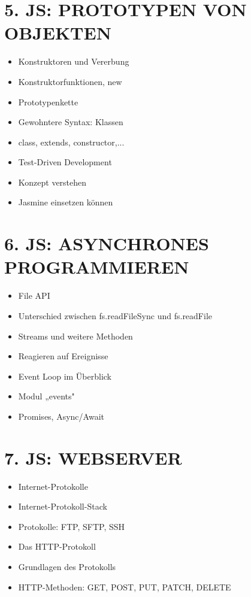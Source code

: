 \section*{5. JS: PROTOTYPEN VON OBJEKTEN}
\begin{itemize}
  \item Konstruktoren und Vererbung
  \item Konstruktorfunktionen, new
  \item Prototypenkette
  \item Gewohntere Syntax: Klassen
  \item class, extends, constructor,...
  \item Test-Driven Development
  \item Konzept verstehen
  \item Jasmine einsetzen können
\end{itemize}

\section*{6. JS: ASYNCHRONES PROGRAMMIEREN}
\begin{itemize}
  \item File API
  \item Unterschied zwischen fs.readFileSync und fs.readFile
  \item Streams und weitere Methoden
  \item Reagieren auf Ereignisse
  \item Event Loop im Überblick
  \item Modul „events"
  \item Promises, Async/Await
\end{itemize}

\section*{7. JS: WEBSERVER}
\begin{itemize}
  \item Internet-Protokolle
  \item Internet-Protokoll-Stack
  \item Protokolle: FTP, SFTP, SSH
  \item Das HTTP-Protokoll
  \item Grundlagen des Protokolls
  \item HTTP-Methoden: GET, POST, PUT, PATCH, DELETE
\end{itemize}

